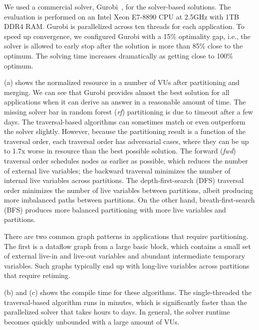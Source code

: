 We used a commercial solver, Gurobi~\cite{gurobi}, for the solver-based solutions. 
The evaluation is performed on an Intel Xeon E7-8890 CPU at 2.5GHz with 1TB DDR4 RAM. 
Gurobi is parallelized across ten threads for each application.
To speed up convergence, we configured Gurobi with a 15\% optimality gap, i.e., the solver is allowed to early stop after the solution is more than 85\% close to the optimum. 
The solving time increases dramatically as getting close to 100\% optimum.

 (a) shows the normalized resource in a number of VUs after partitioning and merging.
We can see that Gurobi provides almost the best solution for all applications when it can derive
an answer in a reasonable amount of time. The missing solver bar in random forest (\emph{rf}) partitioning
is due to timeout after a few days.
The traversal-based algorithms can sometimes match or even outperform the solver slightly.
However, because the partitioning result is a function of the traversal order, 
each traversal order has adversarial cases, where they can be up to 1.7x worse in resource than the best possible solution.
The forward (\emph{fwd}) traversal order schedules nodes as earlier as possible, which reduces the number of
external live variables; the backward traversal minimizes the number of internal live variables
across partitions.
The depth-first-search (DFS) traversal order minimizes the number of live variables between partitions, 
albeit producing more imbalanced paths between partitions. 
On the other hand, breath-first-search (BFS) produces more balanced partitioning with more live variables and partitions.

There are two common graph patterns in applications that require partitioning. 
The first is a dataflow graph from a large basic block, which contains a small set of external
live-in and live-out variables and abundant intermediate temporary variables.
Such graphs typically end up with long-live variables across partitions that require retiming.

 (b) and (c) shows the compile time for these algorithms. The single-threaded
the traversal-based algorithm runs in minutes, which is significantly faster than the parallelized solver that takes hours to days.
In general, the solver runtime becomes quickly unbounded with a large amount of VUs.

